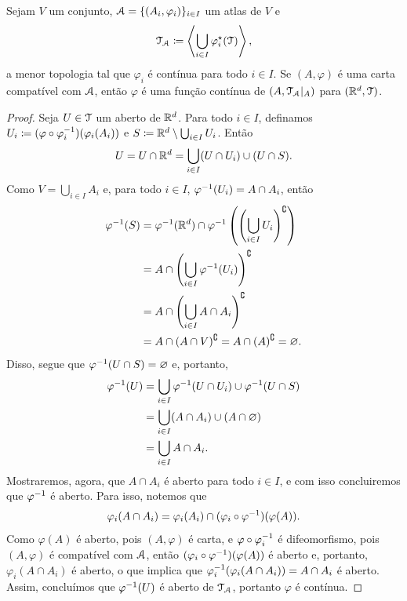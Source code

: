 \begin{prop}
Sejam $V$ um conjunto, $\mathcal{A}=\{(A_i,\varphi_i)\}_{i \in I}$ um atlas de $V$ e
	\begin{equation*}
	\mathcal{T}_{\mathcal{A}} \coloneqq \left\langle \bigcup_{i \in I} \varphi_i^\star(\mathcal{T}) \right\rangle,
	\end{equation*}
a menor topologia tal que $\varphi_i$ é contínua para todo $i \in I$. Se $(A,\varphi)$ é uma carta compatível com $\mathcal{A}$, então $\varphi$ é uma função contínua de $(A,\mathcal{T}_{\mathcal{A}}|_A)$ para $(\mathbb{R}^d,\mathcal{T})$.
\end{prop}
\begin{proof}
Seja $U \in \mathcal{T}$ um aberto de $\mathbb{R}^d$. Para todo $i \in I$, definamos $U_i \coloneqq (\varphi \circ \varphi_i^{-1})(\varphi_i(A_i))$ e $S \coloneqq \mathbb{R}^d \setminus \bigcup_{i \in I} U_i$. Então
	\begin{equation*}
	U = U \cap \mathbb{R}^d = \bigcup_{i \in I} (U \cap U_i) \cup (U \cap S).
	\end{equation*}
Como $V=\bigcup_{i \in I} A_i$ e, para todo $i \in I$, $\varphi^{-1}(U_i) = A \cap A_i$, então
	\begin{align*}
	\varphi^{-1}(S) &= \varphi^{-1}(\mathbb{R}^d) \cap \varphi^{-1}\left(\left(\bigcup_{i \in I} U_i\right)^\complement\right) \\
		&= A \cap \left(\bigcup_{i \in I} \varphi^{-1}(U_i) \right)^\complement \\
		&= A \cap \left(\bigcup_{i \in I} A \cap A_i \right)^\complement \\
		&= A \cap (A \cap V)^\complement = A \cap (A)^\complement = \varnothing.
	\end{align*}
Disso, segue que $\varphi^{-1}(U \cap S)=\varnothing$ e, portanto,
	\begin{align*}
	\varphi^{-1}(U) &= \bigcup_{i \in I} \varphi^{-1}(U \cap U_i) \cup \varphi^{-1}(U \cap S) \\
		&= \bigcup_{i \in I} (A \cap A_i) \cup (A \cap\varnothing) \\
		&= \bigcup_{i \in I} A \cap A_i.
	\end{align*}
Mostraremos, agora, que $A \cap A_i$ é aberto para todo $i \in I$, e com isso concluiremos que $\varphi^{-1}$ é aberto. Para isso, notemos que
	\begin{equation*}
	\varphi_i(A \cap A_i) = \varphi_i(A_i) \cap (\varphi_i \circ \varphi^{-1})(\varphi(A)).
	\end{equation*}
Como $\varphi(A)$ é aberto, pois $(A,\varphi)$ é carta, e $\varphi \circ \varphi_i^{-1}$ é difeomorfismo, pois $(A,\varphi)$ é compatível com $\mathcal{A}$, então $(\varphi_i \circ \varphi^{-1})(\varphi(A))$ é aberto e, portanto, $\varphi_i(A \cap A_i)$ é aberto, o que implica que $\varphi_i^{-1}(\varphi_i(A \cap A_i)) = A \cap A_i$ é aberto. Assim, concluímos que $\varphi^{-1}(U)$ é aberto de $\mathcal{T}_{\mathcal{A}}$, portanto $\varphi$ é contínua.
\end{proof}

